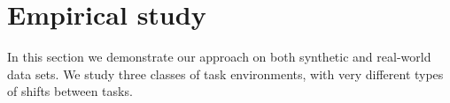 \documentclass{article}
\theoremstyle{plain}
\theoremstyle{definition}
\theoremstyle{remark}
\newcommand{\RM}[1]{{\textcolor{magenta}{#1}}}
\begin{document}

\section{Empirical study} \label{sec:empirical}

In this section we demonstrate our approach on both synthetic and real-world data sets. We study three classes of task environments, with very different types of shifts between tasks.
\end{document}
